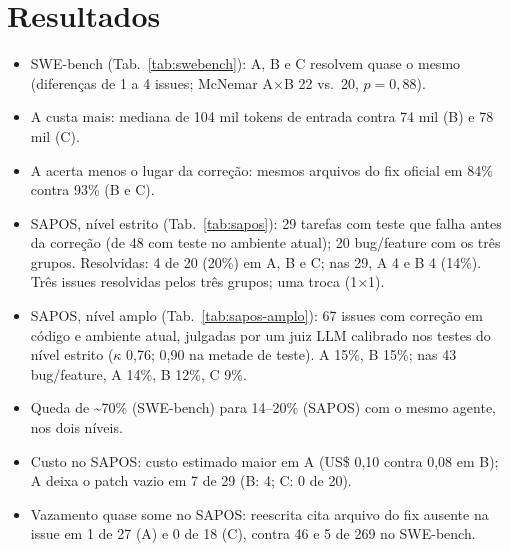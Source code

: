 \documentclass[sigconf]{acmart}
\newcommand{\topicos}[1]{{\color{gray}\begin{itemize}\setlength\itemsep{0pt}#1\end{itemize}}}
\begin{document}
\section{Resultados}



\topicos{
\item SWE-bench (Tab.~\ref{tab:swebench}): A, B e C resolvem quase o mesmo (diferenças de 1 a 4 issues; McNemar A$\times$B 22 vs.\ 20, $p=0{,}88$).
\item A custa mais: mediana de 104 mil tokens de entrada contra 74 mil (B) e 78 mil (C).
\item A acerta menos o lugar da correção: mesmos arquivos do fix oficial em 84\% contra 93\% (B e C).
\item SAPOS, nível estrito (Tab.~\ref{tab:sapos}): 29 tarefas com teste que falha antes da correção (de 48 com teste no ambiente atual); 20 bug/feature com os três grupos. Resolvidas: 4 de 20 (20\%) em A, B e C; nas 29, A 4 e B 4 (14\%). Três issues resolvidas pelos três grupos; uma troca (1$\times$1).
\item SAPOS, nível amplo (Tab.~\ref{tab:sapos-amplo}): 67 issues com correção em código e ambiente atual, julgadas por um juiz LLM calibrado nos testes do nível estrito ($\kappa$ 0,76; 0,90 na metade de teste). A 15\%, B 15\%; nas 43 bug/feature, A 14\%, B 12\%, C 9\%.
\item Queda de \textasciitilde70\% (SWE-bench) para 14--20\% (SAPOS) com o mesmo agente, nos dois níveis.
\item Custo no SAPOS: custo estimado maior em A (US\$ 0,10 contra 0,08 em B); A deixa o patch vazio em 7 de 29 (B: 4; C: 0 de 20).
\item Vazamento quase some no SAPOS: reescrita cita arquivo do fix ausente na issue em 1 de 27 (A) e 0 de 18 (C), contra 46 e 5 de 269 no SWE-bench.
}
\end{document}
